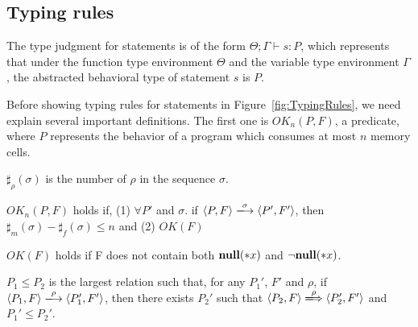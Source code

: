 \subsection{Typing rules}
The type judgment for statements is of the form \(\Theta; \Gamma
\vdash s : P \), which represents that under the function type
environment \(\Theta\) and the variable type environment \(\Gamma\),
the abstracted behavioral type of statement \(s\) is \(P\).

Before showing typing rules for statements in
Figure~\ref{fig:TypingRules}, we need explain several important
definitions. The first one is \(OK_n(P, F)\), a predicate, where \(P\)
represents the behavior of a program which consumes at most \(n\)
memory cells.

\begin{myDef}[\(\sharp_{\rho}(\sigma)\)]
\label{df:sharf}
\(\sharp_{\rho}(\sigma)\) is the number of \(\rho\) in the sequence
\(\sigma\).
\end{myDef}



\begin{myDef}
\label{df:okn}
\(OK_{n}(P, F)\) holds if, (1) \( \forall P'\) and \(\sigma\). if \( \langle P, F \rangle
\xlongrightarrow{\sigma} \langle P', F' \rangle \), then \( \sharp_m(\sigma) - \sharp_f(\sigma) \le n\) and (2) \( OK(F) \)
\end{myDef}

\begin{myDef}
\label{df:okf}
\(OK(F)\) holds if F does not contain both \( {\bf null}(*x) \) and \( \neg{\bf null}(*x) \).
\end{myDef}


\begin{myDef}[Subtyping]
\(P_1 \le P_2\) is the largest relation such that, for any \(P_1'\), \(F'\)
and \(\rho\), if \( \langle P_1, F \rangle \xlongrightarrow{\rho} \langle P_1', F' \rangle \), then there
exists \(P_2'\) such that \( \langle P_2, F \rangle \xLongrightarrow{\rho} \langle P_2', F' \rangle \) and
\(P_1' \le P_2'\).
\label{df:subtype}
\end{myDef}

